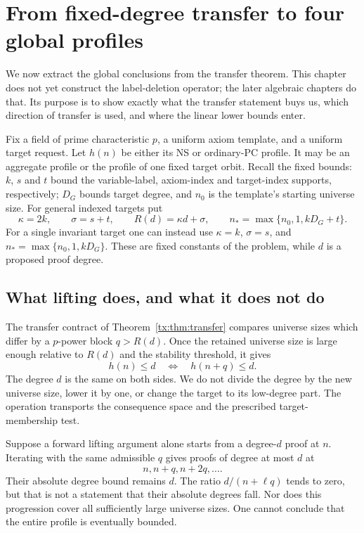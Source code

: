 \chapter{From fixed-degree transfer to four global profiles}\label{tx:ch:profiles}
We now extract the global conclusions from the transfer theorem. This
chapter does not yet construct the label-deletion operator; the later
algebraic chapters do that. Its purpose is to show exactly what the
transfer statement buys us, which direction of transfer is used, and
where the linear lower bounds enter.

Fix a field of prime characteristic $p$, a uniform axiom template, and
a uniform target request. Let $h(n)$ be either its NS or ordinary-PC
profile. It may be an aggregate profile or the profile of one fixed
target orbit. Recall the fixed bounds: $k$, $s$ and $t$ bound the
variable-label, axiom-index and target-index supports, respectively;
$D_G$ bounds target degree, and $n_0$ is the template's starting universe size.
For general indexed targets put
\[
 \kappa=2k,\qquad \sigma=s+t,\qquad R(d)=\kappa d+\sigma,
 \qquad n_*=\max\{n_0,1,kD_G+t\}.
\]
For a single invariant target one can instead use
$\kappa=k$, $\sigma=s$, and $n_*=\max\{n_0,1,kD_G\}$. These are
fixed constants of the problem, while $d$ is a proposed proof degree.

\section{What lifting does, and what it does not do}
The transfer contract of Theorem~\ref{tx:thm:transfer} compares universe sizes
which differ by a $p$-power block $q>R(d)$. Once the retained universe size is
large enough relative to $R(d)$ and the stability threshold, it gives
\[
                         h(n)\le d\quad\Longleftrightarrow\quad
                         h(n+q)\le d.
\]
The degree $d$ is the same on both sides. We do not divide the degree
by the new universe size, lower it by one, or change the target to
its low-degree part. The operation transports the consequence space
and the prescribed target-membership test.

Suppose a forward lifting argument alone starts from a degree-$d$
proof at $n$. Iterating with the same admissible $q$ gives proofs of
degree at most $d$ at
\[
                            n,n+q,n+2q,\ldots.
\]
Their absolute degree bound remains $d$. The ratio $d/(n+\ell q)$
tends to zero, but that is not a statement that their absolute degrees
fall. Nor does this progression cover all sufficiently large universe sizes.
One cannot conclude that the entire profile is eventually bounded.

